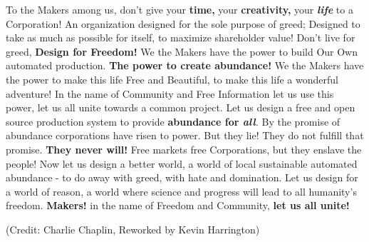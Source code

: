 \documentclass{article}
\begin{document}
{To the Makers among us, don't give your \textbf{time,} your
\textbf{creativity,} your \emph{\textbf{life}} to a Corporation! An
organization designed for the sole purpose of greed; Designed to take as
much as possible for itself, to maximize shareholder value! Don't live
for greed, \textbf{Design for Freedom!} We the Makers have the power to
build Our Own automated production. \textbf{The power to create abundance!} We the Makers have the power to make this life Free and
Beautiful, to make this life a wonderful adventure! In the name of
Community and Free Information let us use this power, let us all unite
towards a common project. Let us design a free and open source
production system to provide \textbf{abundance for \emph{all}}\emph{.}
By the promise of abundance corporations have risen to power. But they
lie! They do not fulfill that promise. \textbf{They never will!} Free
markets free Corporations, but they enslave the people! Now let us
design a better world, a world of local sustainable automated abundance
- to do away with greed, with hate and domination. Let us design for a
world of reason, a world where science and progress will lead to all
humanity's freedom. \textbf{Makers!} in the name of Freedom and
Community, \textbf{let us all unite!}

(Credit: Charlie Chaplin, Reworked by Kevin Harrington)

}
\end{document}
